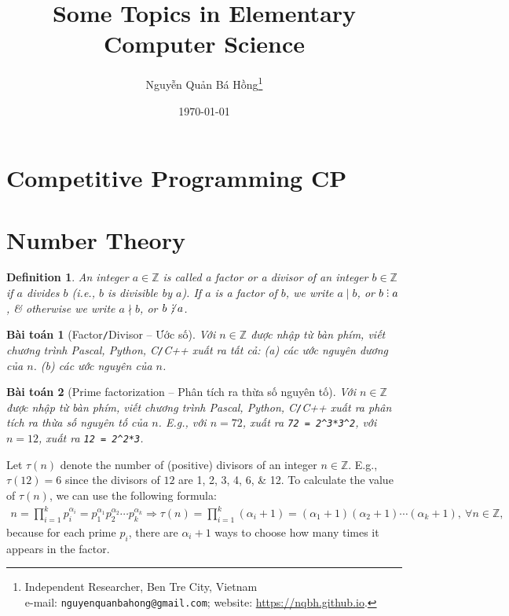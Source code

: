 \documentclass{article}
\title{Some Topics in Elementary Computer Science}
\author{Nguyễn Quản Bá Hồng\footnote{Independent Researcher, Ben Tre City, Vietnam\\e-mail: \texttt{nguyenquanbahong@gmail.com}; website: \url{https://nqbh.github.io}.}}
\date{\today}
\newtheorem{baitoan}{Bài toán}
\newtheorem{definition}{Definition}
\DeclareRobustCommand{\divby}{%
	\mathrel{\vbox{\baselineskip.65ex\lineskiplimit0pt\hbox{.}\hbox{.}\hbox{.}}}%
}
\begin{document}
\maketitle
\begin{abstract}
	
\end{abstract}
\setcounter{secnumdepth}{4}
\setcounter{tocdepth}{3}
\tableofcontents


\section{Competitive Programming CP}


\section{Number Theory}

\begin{definition}
	An integer $a\in\mathbb{Z}$ is called a \emph{factor} or a \emph{divisor} of an integer $b\in\mathbb{Z}$ if $a$ divides $b$ (i.e., $b$ is divisible by $a$). If $a$ is a factor of $b$, we write $a\mid b$, or $b\divby a$, \& otherwise we write $a\nmid b$, or $b\not\,\divby a$.
\end{definition}

\begin{baitoan}[Factor\texttt{/}Divisor -- Ước số]
	Với $n\in\mathbb{Z}$ được nhập từ bàn phím, viết chương trình {\sf Pascal, Python, C\texttt{/}C++} xuất ra tất cả: (a) các ước nguyên dương của $n$. (b) các ước nguyên của $n$.
\end{baitoan}

\begin{baitoan}[Prime factorization -- Phân tích ra thừa số nguyên tố]
	Với $n\in\mathbb{Z}$ được nhập từ bàn phím, viết chương trình {\sf Pascal, Python, C\texttt{/}C++} xuất ra phân tích ra thừa số nguyên tố của $n$. E.g., với $n = 72$, xuất ra \verb|72 = 2^3*3^2|, với $n = 12$, xuất ra \verb|12 = 2^2*3|.
\end{baitoan}
Let $\tau(n)$ denote the number of (positive) divisors of an integer $n\in\mathbb{Z}$. E.g., $\tau(12) = 6$ since the divisors of $12$ are 1, 2, 3, 4, 6, \& 12. To calculate the value of $\tau(n)$, we can use the following formula:
\begin{align*}
	n = \prod_{i=1}^k p_i^{\alpha_i} = p_1^{\alpha_1}p_2^{\alpha_2}\cdots p_k^{\alpha_k}\Rightarrow\tau(n) = \prod_{i=1}^k (\alpha_i + 1) = (\alpha_1 + 1)(\alpha_2 + 1)\cdots(\alpha_k + 1),\ \forall n\in\mathbb{Z},
\end{align*}
because for each prime $p_i$, there are $\alpha_i + 1$ ways to choose how many times it appears in the factor.
\end{document}
